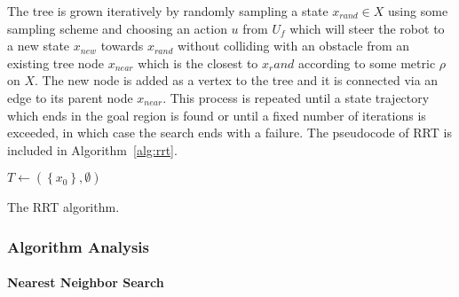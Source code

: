 The tree is grown iteratively by randomly sampling a state $x_{rand}\in X$ using some sampling scheme and choosing an action $u$ from $U_f$ which will steer the robot to a new state $x_{new}$ towards $x_{rand}$ without colliding with an obstacle from an existing tree node $x_{near}$ which is the closest to $x_rand$ according to some metric $\rho$ on $X$. The new node is added as a vertex to the tree and it is connected via an edge to its parent node $x_{near}$. This process is repeated until a state trajectory which ends in the goal region is found or until a fixed number of iterations is exceeded, in which case the search ends with a failure. The pseudocode of RRT is included in Algorithm~\ref{alg:rrt}.

\begin{algorithm}
	\SetAlgoLined
	\DontPrintSemicolon
	
	
	
	$T\gets \left(\left\{x_0\right\}, \emptyset\right)$\;
	
	
	\;
	
	\caption{The RRT algorithm.}
	\label{alg:rrt}
\end{algorithm}

\subsubsection{Algorithm Analysis}

\paragraph{Nearest Neighbor Search}

